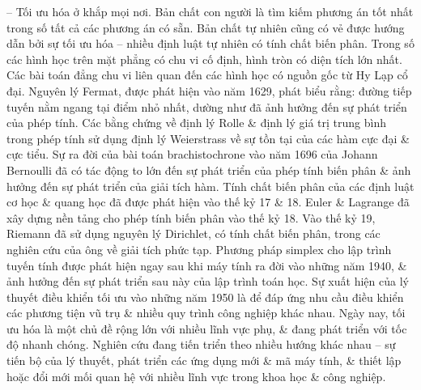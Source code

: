 \documentclass{article}
\begin{document}
\begin{itemize}
    -- Tối ưu hóa ở khắp mọi nơi. Bản chất con người là tìm kiếm phương án tốt nhất trong số tất cả các phương án có sẵn. Bản chất tự nhiên cũng có vẻ được hướng dẫn bởi sự tối ưu hóa -- nhiều định luật tự nhiên có tính chất biến phân. Trong số các hình học trên mặt phẳng có chu vi cố định, hình tròn có diện tích lớn nhất. Các bài toán đẳng chu vi liên quan đến các hình học có nguồn gốc từ Hy Lạp cổ đại. Nguyên lý Fermat, được phát hiện vào năm 1629, phát biểu rằng: đường tiếp tuyến nằm ngang tại điểm nhỏ nhất, dường như đã ảnh hưởng đến sự phát triển của phép tính. Các bằng chứng về định lý Rolle \& định lý giá trị trung bình trong phép tính sử dụng định lý Weierstrass về sự tồn tại của các hàm cực đại \& cực tiểu. Sự ra đời của bài toán brachistochrone vào năm 1696 của {\sc Johann Bernoulli} đã có tác động to lớn đến sự phát triển của phép tính biến phân \& ảnh hưởng đến sự phát triển của giải tích hàm. Tính chất biến phân của các định luật cơ học \& quang học đã được phát hiện vào thế kỷ 17 \& 18. Euler \& Lagrange đã xây dựng nền tảng cho phép tính biến phân vào thế kỷ 18. Vào thế kỷ 19, {\sc Riemann} đã sử dụng nguyên lý Dirichlet, có tính chất biến phân, trong các nghiên cứu của ông về giải tích phức tạp. Phương pháp simplex cho lập trình tuyến tính được phát hiện ngay sau khi máy tính ra đời vào những năm 1940, \& ảnh hưởng đến sự phát triển sau này của lập trình toán học. Sự xuất hiện của lý thuyết điều khiển tối ưu vào những năm 1950 là để đáp ứng nhu cầu điều khiển các phương tiện vũ trụ \& nhiều quy trình công nghiệp khác nhau. Ngày nay, tối ưu hóa là một chủ đề rộng lớn với nhiều lĩnh vực phụ, \& đang phát triển với tốc độ nhanh chóng. Nghiên cứu đang tiến triển theo nhiều hướng khác nhau -- sự tiến bộ của lý thuyết, phát triển các ứng dụng mới \& mã máy tính, \& thiết lập hoặc đổi mới mối quan hệ với nhiều lĩnh vực trong khoa học \& công nghiệp.


\end{itemize}
\end{document}
